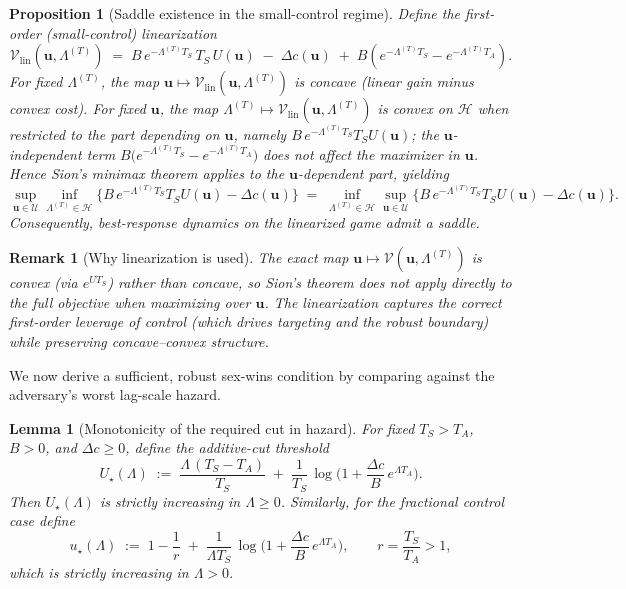 \documentclass[11pt]{article}
\theoremstyle{upright}
\newtheorem{lemma}{Lemma}
\newtheorem{proposition}{Proposition}
\newtheorem{remark}{Remark}
\newcommand{\Uset}{\mathcal{U}}
\newcommand{\Hset}{\mathcal{H}}
\newcommand{\hazT}[1]{\Lambda^{(#1)}}          %
\begin{document}
\begin{proposition}[Saddle existence in the small-control regime]\label{prop:sion}
Define the first-order (small-control) linearization
\[
\mathcal V_{\mathrm{lin}}(\mathbf u,\hazT{T})
\;=\; B\,e^{-\hazT{T}T_S}\,T_S\,U(\mathbf u)\;-\;\Delta c(\mathbf u)\;+\;B\!\left(e^{-\hazT{T}T_S}-e^{-\hazT{T}T_A}\right).
\]
For fixed $\hazT{T}$, the map $\mathbf u\mapsto \mathcal V_{\mathrm{lin}}(\mathbf u,\hazT{T})$ is concave
(linear gain minus convex cost). For fixed $\mathbf u$, the map $\hazT{T}\mapsto \mathcal V_{\mathrm{lin}}(\mathbf u,\hazT{T})$
is convex on $\Hset$ when restricted to the part depending on $\mathbf u$, namely
$B\,e^{-\hazT{T}T_S}T_S U(\mathbf u)$; the $\mathbf u$-independent term
$B\!\big(e^{-\hazT{T}T_S}-e^{-\hazT{T}T_A}\big)$ does not affect the maximizer in $\mathbf u$.
Hence Sion’s minimax theorem applies to the $\mathbf u$-dependent part, yielding
\[
\sup_{\mathbf u\in\Uset}\inf_{\hazT{T}\in\Hset}
\Big\{B\,e^{-\hazT{T}T_S}T_S U(\mathbf u)-\Delta c(\mathbf u)\Big\}
\;=\;
\inf_{\hazT{T}\in\Hset}\sup_{\mathbf u\in\Uset}
\Big\{B\,e^{-\hazT{T}T_S}T_S U(\mathbf u)-\Delta c(\mathbf u)\Big\}.
\]
Consequently, best-response dynamics on the linearized game admit a saddle.
\end{proposition}

\begin{remark}[Why linearization is used]
The exact map $\mathbf u\mapsto \mathcal V(\mathbf u,\hazT{T})$ is convex (via $e^{U T_S}$) rather than concave,
so Sion’s theorem does not apply directly to the full objective when maximizing over $\mathbf u$.
The linearization captures the correct \emph{first-order} leverage of control (which drives targeting and
the robust boundary) while preserving concave–convex structure.
\end{remark}

We now derive a sufficient, robust sex-wins condition by comparing against the adversary’s worst lag-scale hazard.

\begin{lemma}[Monotonicity of the required cut in hazard]\label{lem:mono}
For fixed $T_S>T_A$, $B>0$, and $\Delta c\ge 0$, define the additive-cut threshold
\[
U_\star(\Lambda) \;:=\; \frac{\Lambda\,(T_S-T_A)}{T_S} \;+\;
\frac{1}{T_S}\,\log\!\Big(1+\frac{\Delta c}{B}\,e^{\Lambda T_A}\Big).
\]
Then $U_\star(\Lambda)$ is strictly increasing in $\Lambda\ge 0$.
Similarly, for the fractional control case define
\[
u_\star(\Lambda) \;:=\; 1-\frac{1}{r} \;+\; \frac{1}{\Lambda T_S}\,\log\!\Big(1+\frac{\Delta c}{B}\,e^{\Lambda T_A}\Big),
\qquad r=\frac{T_S}{T_A}>1,
\]
which is strictly increasing in $\Lambda>0$.
\end{lemma}
\end{document}
